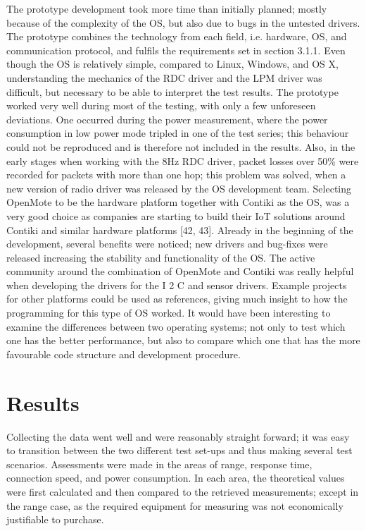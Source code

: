 The prototype development took more time than initially planned;
	mostly because of the complexity of the OS,
	but also due to bugs in the untested drivers.
The prototype combines the technology from each field,
	i.e.
hardware,
	OS,
	and communication protocol,
	and fulfils the requirements set in section 3.1.1.
Even though the OS is relatively simple,
	compared to Linux,
	Windows,
	and OS X,
	understanding the mechanics of the RDC driver and the LPM driver was difficult,
	but necessary to be able to interpret the test results.
The prototype worked very well during most of the testing,
	with only a few unforeseen deviations.
One occurred during the power measurement,
	where the power consumption in low power mode tripled in one of the test series;
	this behaviour could not be reproduced and is therefore not included in the results.
Also,
	in the early stages when working with the 8Hz RDC driver,
	packet losses over 50\% were recorded for packets with more
than one hop;
	this problem was solved,
	when a new version of radio driver was released by the OS development team.
Selecting OpenMote to be the hardware platform together with Contiki as the OS,
	was a very good choice as companies are starting to build their IoT solutions around Contiki and similar hardware platforms [42, 43].
Already in the beginning of the development,
	several benefits were noticed;
	new drivers and bug-fixes were released increasing the stability and functionality of the OS.
The active community around the combination of OpenMote and Contiki was really helpful when developing the drivers for the I 2 C and sensor drivers.
Example projects for other platforms could be used as references,
	giving much insight to how the programming for this type of OS worked.
It would have been interesting to examine the differences between two operating systems;
	not only to test which one has the better performance,
	but also to compare which one that has the more favourable code structure and development procedure.

\section{Results}
Collecting the data went well and were reasonably straight forward;
	it was easy to transition between the two different test set-ups and thus making several test scenarios.
Assessments were made in the areas of range,
	response time,
	connection speed,
	and power consumption.
In each area,
	the theoretical values were first calculated and then compared to the retrieved measurements;
	except in the range case,
	as the required equipment for measuring was not economically justifiable to purchase.
	
